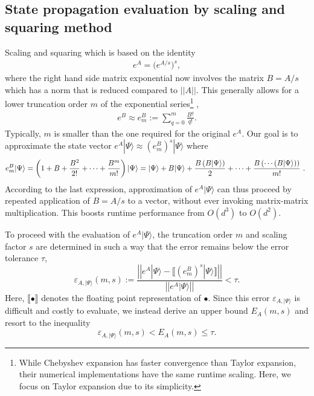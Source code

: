 \documentclass[12pt]{article}
\newcommand{\dket}[1]{|#1\rangle}
\renewcommand{\norm}[1]{\left|\left|#1\right|\right|}
\newcommand{\parenthesis}[1]{\left(#1\right)}
\begin{document}
\subsection{State propagation evaluation by scaling and squaring method}
\label{scaling and squaring method}
Scaling and squaring \cite{codenotti1992error} which is based on the identity
\begin{align}
\label{scaling squaring equation}
   e^A=\big(e^{A/s}\big)^s,
\end{align}
where the right hand side matrix exponential now involves the matrix $B=A/s$ which has a norm that is reduced compared to $\norm{A}$. This generally allows for a lower truncation order $m $ of the exponential series\footnote{While Chebyshev expansion has faster convergence than Taylor expansion, their numerical implementations have the same runtime scaling. Here, we focus on Taylor expansion due to its simplicity.} , 
\begin{align}
\label{eBm equation}
    e^B\approx e^B_m:=\sum_{q=0}^m\frac{ B^q}{q!}.
\end{align}
Typically, $m$ is smaller than the one required for the original $e^A$.
Our goal is to approximate the state vector $e^A \dket{\Psi}\approx (e^B_m)^s\dket{\Psi}$ where 
\begin{equation}
\label{eBmpsi}
   e^B_m\dket{\Psi}= \parenthesis{1+B+\frac{B^2}{2!}+\cdots+\frac{B^m}{m!}}\dket{\Psi}\\\nonumber
   =\dket{\Psi}+B\dket{\Psi}+\frac{B\parenthesis{B\dket{\Psi}}}{2}+\cdots+\frac{B\parenthesis{\cdots \parenthesis{B\dket{\Psi}}}}{m!}\text{   . }
\end{equation}
According to the last expression, approximation of $e^A\dket{\Psi}$ can thus proceed by repeated application of $B=A/s$ to a vector, without ever invoking matrix-matrix multiplication. This boosts runtime performance from $O(d^3)$ to $O(d^2)$.

To proceed with the evaluation of $e^A\dket{\Psi}$, the truncation order $m$ and scaling factor $s$ are determined in such a way that the error remains below the error tolerance $\tau$, 
\begin{equation}
\label{error defnition}
    \varepsilon_{A,\dket{\Psi}}(m,s) := \frac{\norm{e^A\dket{\Psi}-\llbracket (e^B_m)^s\dket{\Psi}\rrbracket}}{\norm{e^A\dket{\Psi}}}< \tau .
\end{equation}
Here, $\llbracket \bullet{}  \rrbracket$ denotes the floating point representation of $\bullet$. Since this error $\varepsilon_{A,\dket{\Psi}}$ is difficult and costly to evaluate, we instead derive an upper bound $E_A(m,s)$ and resort to the inequality 
\begin{equation}
\label{accuracy inequality}
    \varepsilon_{A,\dket{\Psi}}(m,s)<E_A(m,s)\leq \tau.
\end{equation}
\end{document}
